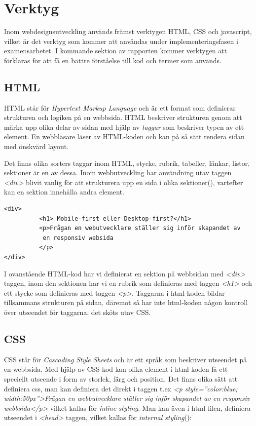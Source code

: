 \documentclass[11pt]{article}
\begin{document}
\section{Verktyg}

Inom webdesignsutveckling används främst verktygen HTML, CSS och javascript, vilket är det verktyg som kommer att användas under implementeringsfasen i examensarbetet.  I kommande sektion av rapporten kommer verktygen att förklaras för att få en bättre förståelse till kod och termer som används.

\subsection{HTML}
HTML står för \textit{Hypertext Markup Language} och är ett format som definierar strukturen och logiken på en webbsida. HTML beskriver strukturen genom att märka upp olika delar av sidan med hjälp av \textit{taggar} som beskriver typen av ett element. En webbläsare läser av HTML-koden och kan på så sätt rendera sidan med önskvärd layout.

Det finns olika sorters taggar inom HTML, stycke, rubrik, tabeller, länkar, listor, sektioner är en av dessa. Inom webbutveckling har användning utav taggen \textit{<div>} blivit vanlig för att strukturera upp en sida i olika sektioner(\cite{divtable}), vartefter kan en sektion innehålla andra element.

\vspace{1cm}
\begin{verbatim}
<div> 
          <h1> Mobile-first eller Desktop-first?</h1>
          <p>Frågan en webutvecklare ställer sig inför skapandet av
           en responsiv websida
          </p>
</div>
\end{verbatim}
\vspace{1cm}

I ovanstående HTML-kod har vi definierat en sektion på webbsidan med \textit{<div>} taggen, inom den sektionen har vi en rubrik som definieras med taggen \textit{<h1>} och ett stycke som definieras med taggen \textit{<p>}. Taggarna i html-koden bildar tillsammans strukturen på sidan, däremot så har inte html-koden någon kontroll över utseendet för taggarna, det sköts utav CSS.  

\subsection{CSS}
CSS står för \textit{Cascading Style Sheets} och är ett språk som beskriver utseendet på en webbsida.
Med hjälp av CSS-kod kan olika element i html-koden få ett speciellt utseende i form av storlek, färg och position. Det finns olika sätt att definiera css, man kan definiera det direkt i taggen t.ex \textit{<p style=”color:blue; width:50px”>Frågan en webbutvecklare ställer sig inför skapandet av en responsiv webbsida</p>} vilket kallas för \textit{inline-styling}. Man kan även i html filen, definiera utseendet i \textit{<head>} taggen, vilket kallas för \textit{internal styling}(\cite{css}):
\end{document}
